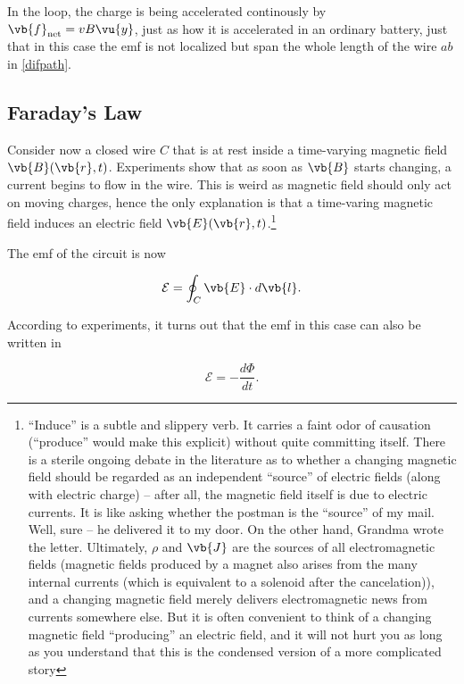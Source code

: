 \documentclass[english,a4paper,12pt]{report}
\begin{document}
In the loop, the charge is being accelerated continously by \(\vb{f} _{\text{net} } = vB \vu{y}  \), just as how it is accelerated in an ordinary battery, just that in this case the emf is not localized but span the whole length of the wire \(ab\) in \cref{difpath}.    

\subsection{Faraday's Law}

Consider now a closed wire \(C\) that is at rest inside a time-varying magnetic field \(\vb{B} (\vb{r} ,t)\). Experiments show that as soon as \(\vb{B} \) starts changing, a current begins to flow in the wire. This is weird as magnetic field should only act on moving charges, hence the only explanation is that a time-varing magnetic field induces an electric field \(\vb{E} (\vb{r} ,t)\).\footnote{``Induce'' is a subtle and slippery verb. It carries a faint odor of causation (“produce” would make this explicit) without quite committing itself. There is a sterile ongoing debate in the literature as to whether a changing magnetic field should be regarded as an independent “source” of electric fields (along with electric charge) -- after all, the magnetic field itself is due to electric currents. It is like asking whether the postman is the “source” of my mail. Well, sure -- he delivered it to my door. On the other hand, Grandma wrote the letter. Ultimately, \(\rho \)  and \(\vb{J} \)  are the sources of all electromagnetic fields (magnetic fields produced by a magnet also arises from the many internal currents (which is equivalent to a solenoid after the cancelation)), and a changing magnetic field merely delivers electromagnetic news from currents somewhere else. But it is often convenient to think of a changing magnetic field “producing” an electric field, and it will not hurt you as long as you understand that this is the condensed version of a more complicated story}
 
The emf of the circuit is now

\begin{equation}
    \mathcal{E} = \oint_{C} \vb{E} \cdot d \vb{l}.
\end{equation}

According to experiments, it turns out that the emf in this case can also be written in

\begin{equation}
    \mathcal{E}= - \frac{d\Phi }{dt}.
\end{equation}
\end{document}
